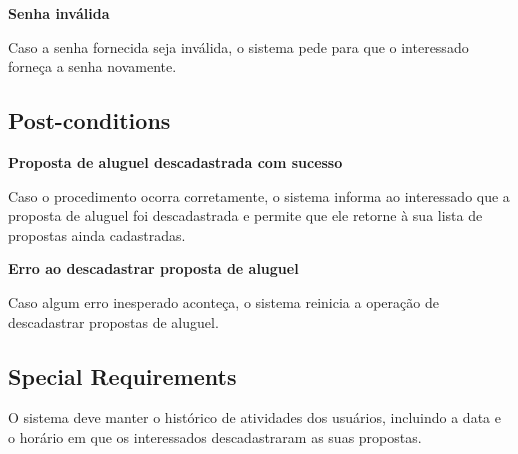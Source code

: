 \textbf{Senha inválida}

Caso a senha fornecida seja inválida, o sistema pede para que o interessado forneça a senha
novamente.


\subsection*{Post-conditions}

\textbf{Proposta de aluguel descadastrada com sucesso}

Caso o procedimento ocorra corretamente, o sistema informa ao interessado que a proposta de
aluguel foi descadastrada e permite que ele retorne à sua lista de propostas ainda cadastradas.

\textbf{Erro ao descadastrar proposta de aluguel}

Caso algum erro inesperado aconteça, o sistema reinicia a operação de descadastrar propostas
de aluguel.

\subsection*{Special Requirements} 
O sistema deve manter o histórico de atividades dos usuários, incluindo a data e o horário em que
os interessados descadastraram as suas propostas.